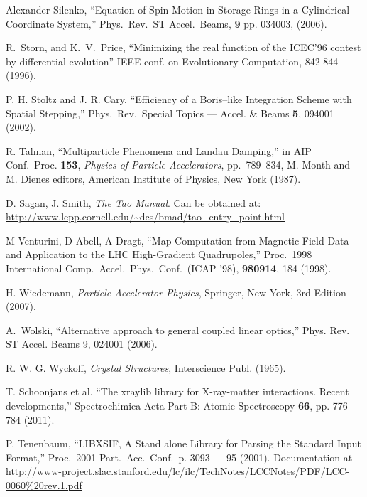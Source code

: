 \begin{thebibliography}{XXXXXXX99}
Alexander Silenko, 
``Equation of Spin Motion in Storage Rings in a Cylindrical Coordinate System,''
Phys.\ Rev.\ ST Accel.\ Beams, {\bf 9} pp. 034003, (2006).


R.~Storn, and K.~V.~Price, ``Minimizing the real function of the
ICEC'96 contest by differential evolution'' IEEE conf. on Evolutionary
Computation, 842-844 (1996).

P. H. Stoltz and J. R. Cary, ``Efficiency of a Boris--like Integration
Scheme with Spatial Stepping,'' Phys.\ Rev.\ Special Topics ---
Accel. \& Beams {\bf 5}, 094001 (2002).

 R. Talman, ``Multiparticle Phenomena and
Landau Damping,'' in AIP Conf.\ Proc.  {\bf 153}, {\em Physics of
Particle Accelerators}, pp.~789--834, M. Month and M. Dienes editors,
American Institute of Physics, New York (1987).

D. Sagan, J. Smith, {\it The Tao Manual}.
Can be obtained at: \hfill\break
\hspace*{0.3in}
\url{http://www.lepp.cornell.edu/~dcs/bmad/tao_entry_point.html}

M Venturini, D Abell, A Dragt, 
``Map Computation from Magnetic Field Data and Application to the LHC
High-Gradient Quadrupoles,'' 
Proc.\ 1998 International Comp.\ Accel.\ Phys.\ Conf.\ (ICAP '98),
{\bf 980914}, 184 (1998).

H. Wiedemann, {\em Particle Accelerator Physics}, Springer, New York, 3rd Edition (2007). 

A.~Wolski,  ``Alternative approach to general coupled linear optics,''
Phys. Rev. ST Accel. Beams 9, 024001 (2006).

R. W. G. Wyckoff, {\em Crystal Structures}, Interscience Publ. (1965).

T. Schoonjans et al. ``The xraylib library for X-ray-matter
interactions. Recent developments,'' Spectrochimica Acta Part B: Atomic
Spectroscopy {\bf 66}, pp. 776-784 (2011).

P. Tenenbaum, ``LIBXSIF, A Stand alone Library for Parsing the Standard 
Input Format,'' Proc.\ 2001 Part.\ Acc.\ Conf.\ p. 3093 --- 95 (2001).
Documentation at
\hfill\break
\hspace*{0.3in} \url{http://www-project.slac.stanford.edu/lc/ilc/TechNotes/LCCNotes/PDF/LCC-0060%20rev.1.pdf}

\end{thebibliography}
